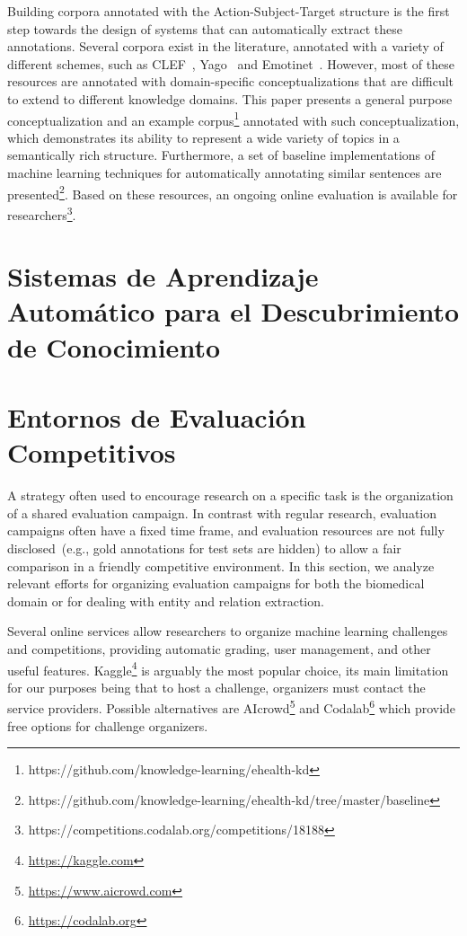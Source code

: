 Building corpora annotated with the Action-Subject-Target structure is the first step towards the design of systems that can automatically extract these annotations. Several corpora exist in the literature, annotated with a variety of different schemes, such as CLEF~\cite{kelly2016overview}, Yago~\cite{fabian2007yago} and Emotinet~\cite{emotinet}.
However, most of these resources are annotated with domain-specific conceptualizations that are difficult to extend to different knowledge domains.
This paper presents a general purpose conceptualization and an example corpus\footnote{https://github.com/knowledge-learning/ehealth-kd}
annotated with such conceptualization, which demonstrates its ability to represent a wide variety of topics in a semantically rich structure.
Furthermore, a set of baseline implementations of machine learning techniques for automatically annotating similar sentences are presented\footnote{https://github.com/knowledge-learning/ehealth-kd/tree/master/baseline}.
Based on these resources, an ongoing online evaluation is available for researchers\footnote{https://competitions.codalab.org/competitions/18188}.

  \section{Sistemas de Aprendizaje Automático para el Descubrimiento de Conocimiento}

  \section{Entornos de Evaluación Competitivos}

  A strategy often used to encourage research on a specific task is the organization of a shared
  evaluation campaign. In contrast with regular research, evaluation campaigns often have a fixed
  time frame, and evaluation resources are not fully disclosed~(e.g., gold annotations for
  test sets are hidden) to allow a fair comparison in a friendly competitive environment.
  In this section, we analyze relevant efforts for organizing evaluation campaigns for both the biomedical domain or for dealing with entity and relation extraction.

  Several online services allow researchers to organize machine learning challenges and competitions, providing automatic grading, user management, and other useful features.
  Kaggle\footnote{\url{https://kaggle.com}} is arguably the most popular choice, its main limitation for our purposes being that to host a challenge, organizers must contact the service providers. Possible alternatives are AIcrowd\footnote{\url{https://www.aicrowd.com}} and
  Codalab\footnote{\url{https://codalab.org}} which provide free options for challenge organizers.

